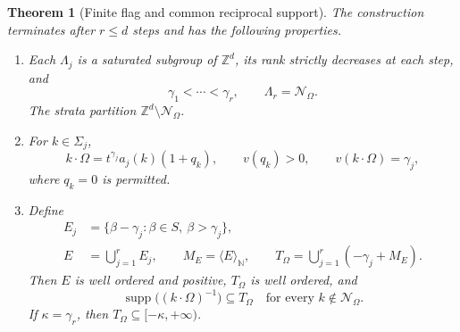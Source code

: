 \documentclass[11pt,letterpaper]{article}
\newtheorem{theorem}{Theorem}[section]
\theoremstyle{definition}
\theoremstyle{remark}
\newcommand{\Z}{\mathbb Z}
\newcommand{\N}{\mathbb N}
\newcommand{\supp}{\operatorname{supp}}
\newcommand{\mon}[1]{\langle #1\rangle_{\N}}
\newcommand{\res}{\mathcal N_{\Omega}}
\numberwithin{equation}{section}
\begin{document}
\begin{theorem}[Finite flag and common reciprocal support]\label{thm:flag}
The construction terminates after $r\le d$ steps and has the following
properties.
\begin{enumerate}[label=(\roman*),leftmargin=*]
\item Each $\Lambda_j$ is a saturated subgroup of $\Z^d$, its rank strictly
decreases at each step, and
\[
 \gamma_1<\cdots<\gamma_r,\qquad \Lambda_r=\res.
\]
The strata partition $\Z^d\setminus\res$.
\item For $k\in\Sigma_j$,
\[
 k\cdot\Omega=t^{\gamma_j}a_j(k)(1+q_k),
 \qquad v(q_k)>0,
 \qquad v(k\cdot\Omega)=\gamma_j,
\]
where $q_k=0$ is permitted.
\item Define
\begin{align}
 E_j&=\{\beta-\gamma_j:\beta\in S,\ \beta>\gamma_j\},\label{eq:E}\\
 E&=\bigcup_{j=1}^rE_j,\qquad M_E=\mon E,\qquad
 T_\Omega=\bigcup_{j=1}^r(-\gamma_j+M_E).\label{eq:T}
\end{align}
Then $E$ is well ordered and positive, $T_\Omega$ is well ordered, and
\[
 \supp\bigl((k\cdot\Omega)^{-1}\bigr)\subseteq T_\Omega
 \quad\text{for every }k\notin\res.
\]
If $\kappa=\gamma_r$, then $T_\Omega\subseteq[-\kappa,+\infty)$.
\end{enumerate}
\end{theorem}
\end{document}
